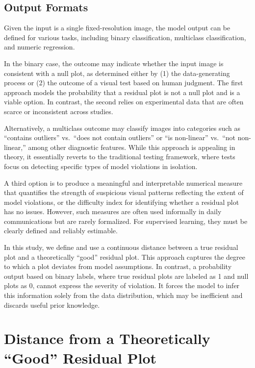 \documentclass[]{interact}
\theoremstyle{plain}%
\theoremstyle{definition}
\theoremstyle{remark}
\begin{document}
\subsection{Output Formats}\label{output-formats}

Given the input is a single fixed-resolution image, the model output can
be defined for various tasks, including binary classification,
multiclass classification, and numeric regression.

In the binary case, the outcome may indicate whether the input image is
consistent with a null plot, as determined either by (1) the
data-generating process or (2) the outcome of a visual test based on
human judgment. The first approach models the probability that a
residual plot is not a null plot and is a viable option. In contrast,
the second relies on experimental data that are often scarce or
inconsistent across studies.

Alternatively, a multiclass outcome may classify images into categories
such as ``contains outliers'' vs.~``does not contain outliers'' or ``is
non-linear'' vs.~``not non-linear,'' among other diagnostic features.
While this approach is appealing in theory, it essentially reverts to
the traditional testing framework, where tests focus on detecting
specific types of model violations in isolation.

A third option is to produce a meaningful and interpretable numerical
measure that quantifies the strength of suspicious visual patterns
reflecting the extent of model violations, or the difficulty index for
identifying whether a residual plot has no issues. However, such
measures are often used informally in daily communications but are
rarely formalized. For supervised learning, they must be clearly defined
and reliably estimable.

In this study, we define and use a continuous distance between a true
residual plot and a theoretically ``good'' residual plot. This approach
captures the degree to which a plot deviates from model assumptions. In
contrast, a probability output based on binary labels, where true
residual plots are labeled as 1 and null plots as 0, cannot express the
severity of violation. It forces the model to infer this information
solely from the data distribution, which may be inefficient and discards
useful prior knowledge.

\section{Distance from a Theoretically ``Good'' Residual
Plot}\label{sec-model-distance-between-residual-plots}
\end{document}
